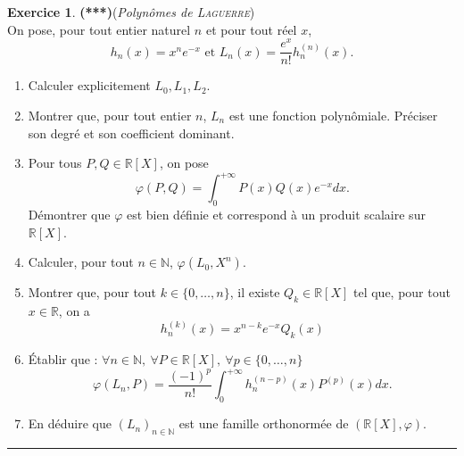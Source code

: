\documentclass[a4paper,11pt]{article}
\theoremstyle{definition}
\newtheorem{exo}{Exercice} %
\begin{document}
\begin{minipage}{1\linewidth}
\begin{minipage}[t]{0.48\linewidth}
		
		\begin{exo}\textbf{(***)}\quad (\textit{Polynômes de \textsc{Laguerre}})\\[0.2cm]
			On pose, pour tout entier naturel $n$ et pour tout réel $x$, 
			$$h_n(x)=x^ne^{-x}\textrm{ et }L_n(x)=\frac{e^x}{n!}h_n^{(n)}(x).$$
			\begin{enumerate}
				\item Calculer explicitement $L_0,L_1,L_2$.
				\item Montrer que, pour tout entier $n$, $L_n$ est une fonction polynômiale. Préciser son degré et son coefficient dominant.
				\item Pour tous $P,Q\in\mathbb R[X]$, on pose 
				$$\varphi(P,Q)=\int_0^{+\infty}P(x)Q(x)e^{-x}dx.$$
				Démontrer que $\varphi$ est bien définie et correspond à un produit scalaire sur $\mathbb R[X]$.
				\item Calculer, pour tout $n\in\mathbb N$, $\varphi(L_0,X^n)$.
				\item Montrer que, pour tout $k\in\{0,\dots,n\}$, il existe $Q_k\in\mathbb R[X]$ tel que, pour tout $x\in\mathbb R$, on a $$h_n^{(k)}(x)=x^{n-k}e^{-x}Q_k(x)$$
					\item \'Etablir que : $\forall n\in\mathbb N,\ \forall P\in\mathbb R[X],\ \forall p\in\{0,\dots,n\}$
					$$\varphi(L_n,P)=\frac{(-1)^p}{n!}\int_0^{+\infty}h_n^{(n-p)}(x)P^{(p)}(x)dx.$$
				\item En déduire que $(L_n)_{n\in\mathbb N}$ est une famille orthonormée de $(\mathbb R[X],\varphi)$.
			\end{enumerate}
			
			\centering\rule{1\linewidth}{0.6pt}\end{exo}
		
		
\end{minipage}\end{minipage} \newpage
\end{document}
